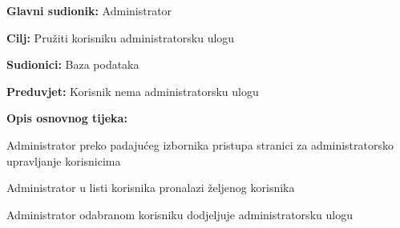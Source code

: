 					\noindent {}
					\begin{packed_item}
						
						\item \textbf{Glavni sudionik: } Administrator
						\item  \textbf{Cilj:} Pružiti korisniku administratorsku ulogu
						\item  \textbf{Sudionici:} Baza podataka
						\item  \textbf{Preduvjet:} Korisnik nema administratorsku ulogu
						\item  \textbf{Opis osnovnog tijeka:}
						
						\item[] \begin{packed_enum}
							
							\item Administrator preko padajućeg izbornika pristupa stranici za administratorsko upravljanje korisnicima
							\item Administrator u listi korisnika pronalazi željenog korisnika
							\item Administrator odabranom korisniku dodjeljuje administratorsku ulogu
							
						\end{packed_enum}
					\end{packed_item}	
					
